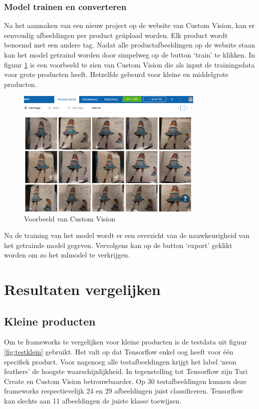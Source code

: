 \subsubsection{Model trainen en converteren}
\label{sssec:Model trainen en converteren}

Na het aanmaken van een nieuw project op de website van Custom Vision, kan er eenvoudig afbeeldingen per product geüpload worden. Elk product wordt benoemd met een andere tag. Nadat alle productafbeeldingen op de website staan kan het model getraind worden door simpelweg op de button ‘train’ te klikken. In figuur \ref{fig:customvision} is een voorbeeld te zien van Custom Vision die als input de trainingsdata voor grote producten heeft. Hetzelfde gebeurd voor kleine en middelgrote producten.

\begin{figure}
    \centering
        \includegraphics[width=0.8\textwidth]{img/customvision.png}
    \caption{Voorbeeld van Custom Vision}
    \label{fig:customvision}
  \end{figure}

Na de training van het model wordt er een overzicht van de nauwkeurigheid van het getrainde model gegeven. Vervolgens kan op de button ‘export’ geklikt worden om zo het mlmodel te verkrijgen.


\section{Resultaten vergelijken}
\label{sec:Resultaten vergelijken}

\subsection{Kleine producten}
\label{ssec:Kleine producten}

Om te frameworks te vergelijken voor kleine producten is de testdata uit figuur \ref{fig:testklein} gebruikt. Het valt op dat Tensorflow enkel oog heeft voor één specifiek product. Voor nagenoeg alle testafbeeldingen krijgt het label ‘neon feathers’ de hoogste waarschijnlijkheid. In tegenstelling tot Tensorflow zijn Turi Create en Custom Vision betrouwbaarder. Op 30 testafbeeldingen kunnen deze frameworks respectievelijk 24 en 29 afbeeldingen juist classificeren. Tensorflow kan slechts aan 11 afbeeldingen de juiste klasse toewijzen. 

